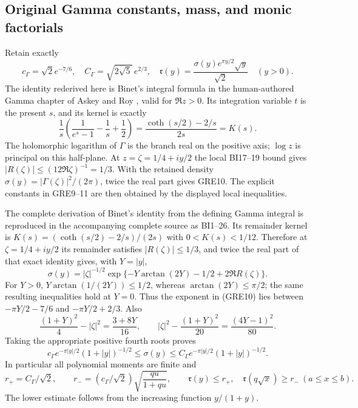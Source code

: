 \documentclass[11pt,a4paper]{article}
\begin{document}
\subsection{Original Gamma constants, mass, and monic factorials}

Retain exactly
\[
 c_\Gamma=\sqrt2e^{-7/6},\quad
 C_\Gamma=\sqrt{2\sqrt5}\,e^{2/3},\quad
 \mathfrak r(y)=\frac{\sigma(y)e^{\pi y/2}\sqrt y}{\sqrt2}
 \quad(y>0).
 \tag{GRE9}
\]
The identity rederived here is Binet's integral formula in the
human-authored Gamma chapter of Askey and Roy
\cite[eq.~(5.9.10\_2)]{human:dlmf5}, valid for $\Re z>0$.
Its integration variable $t$ is the present $s$, and its kernel is
exactly
\[
 \frac1s\left(\frac1{e^s-1}-\frac1s+\frac12\right)
 =\frac{\coth(s/2)-2/s}{2s}=K(s).
\]
The holomorphic logarithm of $\Gamma$ is the branch real on the
positive axis; $\log z$ is principal on this half-plane. At
$z=\zeta=1/4+iy/2$ the local BI17--19 bound gives
$|R(\zeta)|\le(12\Re\zeta)^{-1}=1/3$.
With the retained density
$\sigma(y)=|\Gamma(\zeta)|^2/(2\pi)$, twice the real part
gives GRE10. The explicit constants in GRE9--11 are then obtained
by the displayed local inequalities.

The complete derivation of Binet's identity from the defining Gamma
integral is reproduced in the accompanying complete source as BI1--26. Its remainder kernel is
$K(s)=(\coth(s/2)-2/s)/(2s)$ with $0<K(s)<1/12$. Therefore at
$\zeta=1/4+iy/2$ its remainder satisfies $|R(\zeta)|\le1/3$,
and twice the real part of that exact identity gives, with $Y=|y|$,
\[
 \sigma(y)=|\zeta|^{-1/2}
 \exp\{-Y\arctan(2Y)-1/2+2\Re R(\zeta)\}.
 \tag{GRE10}
\]
For $Y>0$, $Y\arctan(1/(2Y))\le1/2$, whereas
$\arctan(2Y)\le\pi/2$; the same resulting inequalities hold at
$Y=0$. Thus the exponent in (GRE10) lies between
$-\pi Y/2-7/6$ and $-\pi Y/2+2/3$. Also
\[
 \frac{(1+Y)^2}{4}-|\zeta|^2=\frac{3+8Y}{16},\qquad
 |\zeta|^2-\frac{(1+Y)^2}{20}=\frac{(4Y-1)^2}{80}.
\]
Taking the appropriate positive fourth roots proves
\[
 c_\Gamma e^{-\pi|y|/2}(1+|y|)^{-1/2}
 \le\sigma(y)\le
 C_\Gamma e^{-\pi|y|/2}(1+|y|)^{-1/2}.
 \tag{GRE11}
\]
In particular all polynomial moments are finite and
\[
 r_+=C_\Gamma/\sqrt2,\qquad
 r_-=(c_\Gamma/\sqrt2)\sqrt{\frac{qu}{1+qu}},\qquad
 \mathfrak r(y)\le r_+,\quad
 \mathfrak r(q\sqrt x)\ge r_-\ (a\le x\le b).
 \tag{GRE12}
\]
The lower estimate follows from the increasing function $y/(1+y)$.
\end{document}
